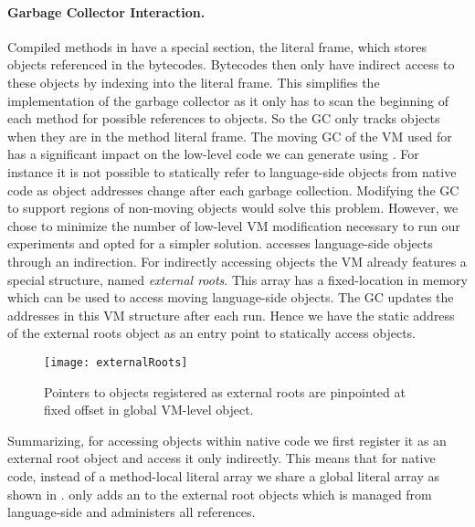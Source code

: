 \paragraph{Garbage Collector Interaction.}

Compiled methods in \PH have a special section, the literal frame, which stores objects referenced in the bytecodes.
Bytecodes then only have indirect access to these objects by indexing into the literal frame.
This simplifies the implementation of the garbage collector as it only has to scan the beginning of each method for possible references to objects. 
So the GC only tracks \ST objects when they are in the method literal frame. 
The moving GC of the VM used for \PH has a significant impact on the low-level code we can generate using \B.
For instance it is not possible to statically refer to language-side objects from native code as object addresses change after each garbage collection.
Modifying the GC to support regions of non-moving objects would solve this problem.
However, we chose to minimize the number of low-level VM modification necessary to run our experiments and opted for a simpler solution.
\B accesses language-side objects through an indirection.
For indirectly accessing objects the \PH VM already features a special structure, named \emph{external roots}.
This array has a fixed-location in memory which can be used to access moving language-side objects.
The GC updates the addresses in this VM structure after each run.
Hence we have the static address of the external roots object as an entry point to statically access \ST objects.
%
\begin{figure}[ht]
	\centering
	\texttt{[image: externalRoots]}
	\caption[Benzo External Roots]{Pointers to objects registered as external roots are pinpointed at fixed offset in global VM-level object.
	}
\end{figure}
%
Summarizing, for accessing \ST objects within native code we first register it as an external root object and access it only indirectly.
This means that for native code, instead of a method-local literal array we share a global literal array as shown in . 
\B only adds an  to the external root objects which is managed from language-side and administers all references.

